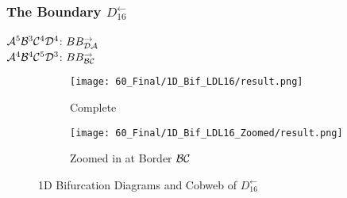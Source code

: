 \subsubsection{The Boundary $D_{16}^\leftarrow$}

$\mathcal{A}^5\mathcal{B}^3\mathcal{C}^4\mathcal{D}^4$: $BB_{\mathcal{D}\mathcal{A}}^\rightarrow$ \\
$\mathcal{A}^4\mathcal{B}^4\mathcal{C}^5\mathcal{D}^3$: $BB_{\mathcal{B}\mathcal{C}}^\rightarrow$

\begin{figure}
    \centering
    \begin{subfigure}{0.4\textwidth}
        \centering
        \texttt{[image: 60\_Final/1D\_Bif\_LDL16/result.png]}
        \caption{Complete}
        \label{fig:final.bifurcation.D.left}
    \end{subfigure}
    \begin{subfigure}{0.4\textwidth}
        \centering
        \texttt{[image: 60\_Final/1D\_Bif\_LDL16\_Zoomed/result.png]}
        \caption{Zoomed in at Border $\mathcal{B}\mathcal{C}$}
        \label{fig:final.bifurcation.D.left.zoomed}
    \end{subfigure}
    \caption{1D Bifurcation Diagrams and Cobweb of $D_{16}^\leftarrow$}
\end{figure}

